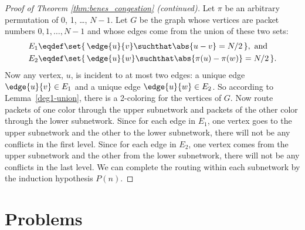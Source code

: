 \begin{proof}[Proof of Theorem \ref{thm:benes_congestion}
    \textup(continued\textup)] 

Let $\pi$ be an arbitrary permutation of 0, 1, \dots, $N-1$.  Let $G$
be the graph whose vertices are packet numbers $0, 1, \dots, N-1$ and
whose edges come from the union of these two sets:
\begin{align*}
E_1 \eqdef &  \set{\, \edge{u}{v} \suchthat \abs{u - v} = N/2 \,},\ \text{and} \\
E_2 \eqdef &  \set{\, \edge{u}{w} \suchthat \abs{\pi(u) - \pi(w)} = N/2\,}.
\end{align*}
Now any vertex, $u$, is incident to at most two edges: a unique edge
$\edge{u}{v} \in E_1$ and a unique edge $\edge{u}{w} \in E_2$.  So
according to Lemma~\ref{deg1-union}, there is a 2-coloring for the
vertices of $G$.  Now route packets of one color through the upper
subnetwork and packets of the other color through the lower
subnetwork.  Since for each edge in $E_1$, one vertex goes to the
upper subnetwork and the other to the lower subnetwork, there will not
be any conflicts in the first level.  Since for each edge in $E_2$,
one vertex comes from the upper subnetwork and the other from the
lower subnetwork, there will not be any conflicts in the last level.
We can complete the routing within each subnetwork by the induction
hypothesis $P(n)$.
\end{proof}

\section{Problems}

\begin{problems}
\examproblems
{}

\classproblems
{}

\homeworkproblems
{}
\end{problems}

\iffalse
In class, you will work through an example in which you route packets
using this recursive idea!
\fi

\endinput




\endinput

